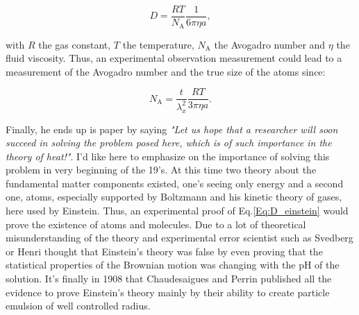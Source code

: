 \begin{equation}
	D = \frac{R T}{N_\mathrm{A}}\frac{1}{6\pi \eta a},
	\label{Eq:D_einstein}
\end{equation}


with $R$ the gas constant, $T$ the temperature, $N_\mathrm{A}$ the Avogadro number and $\eta$ the fluid viscosity. Thus, an experimental observation measurement could lead to a measurement of the Avogadro number and the true size of the atoms since:

\begin{equation}
	N_\mathrm{A} = \frac{t}{\lambda_x^2} \frac{RT}{3\pi \eta a}.
\end{equation}

Finally, he ends up is paper \cite{einstein_uber_1905} by saying \textit{"Let us hope that a researcher will soon succeed in solving the problem posed here, which is of such importance in the theory of heat!"}. I'd like here to emphasize on the importance of solving this problem in very beginning of the 19's. At this time two theory about the fundamental matter components existed, one's seeing only energy and a second one, atoms, especially supported by Boltzmann and his kinetic theory of gases, here used by Einstein. Thus, an experimental proof of Eq.\ref{Eq:D_einstein} would prove the existence of atoms and molecules. Due to a lot of theoretical misunderstanding of the theory and experimental error scientist such as Svedberg or Henri thought that Einstein's theory was false \cite{genthon_concept_2020} by even proving that the statistical properties of the Brownian motion was changing with the pH of the solution. It's finally in 1908 that Chaudesaigues and Perrin published all the evidence to prove Einstein's theory mainly by their ability to create particle emulsion of well controlled radius. 

